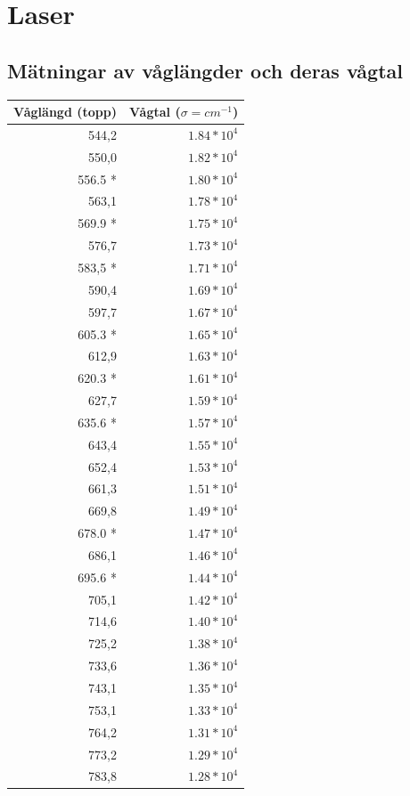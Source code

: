 \documentclass[a4paper,10pt]{article}
\begin{document}
\newpage

\section{Laser} %

\subsection{Mätningar av våglängder och deras vågtal}
\begin {center}
\begin {tabular}[c]{|r|r|}

	\hline
	Våglängd (topp) & Vågtal ($\sigma = cm^{-1}$)\\
	\hline
	544,2 & $ 1.84*10^4$ \\
	550,0 & $ 1.82*10^4$ \\
	556.5 * & $ 1.80*10^4$ \\
	563,1 & $ 1.78*10^4$ \\
	569.9 * & $ 1.75*10^4$ \\
	576,7 & $ 1.73*10^4$ \\
	583,5 * & $ 1.71*10^4$ \\
	590,4 & $ 1.69*10^4$ \\
	597,7 & $ 1.67*10^4$ \\
	605.3 * & $ 1.65*10^4$ \\
	612,9 & $ 1.63*10^4$ \\
	620.3 * & $ 1.61*10^4$ \\
	627,7 & $ 1.59*10^4$ \\
	635.6 * & $ 1.57*10^4$ \\
	643,4 & $ 1.55*10^4$ \\
	652,4 & $ 1.53*10^4$ \\
	661,3 & $ 1.51*10^4$ \\
	669,8 & $ 1.49*10^4$ \\
	678.0 * & $ 1.47*10^4$ \\
	686,1 & $ 1.46*10^4$ \\
	695.6 * & $ 1.44*10^4$ \\
	705,1 & $ 1.42*10^4$ \\
	714,6 & $ 1.40*10^4$ \\
	725,2 & $ 1.38*10^4$ \\
	733,6 & $ 1.36*10^4$ \\
	743,1 & $ 1.35*10^4$ \\
	753,1 & $ 1.33*10^4$ \\
	764,2 & $ 1.31*10^4$ \\
	773,2 & $ 1.29*10^4$ \\
	783,8 & $ 1.28*10^4$ \\
	\hline

\end {tabular}
\end {center}
\end{document}

